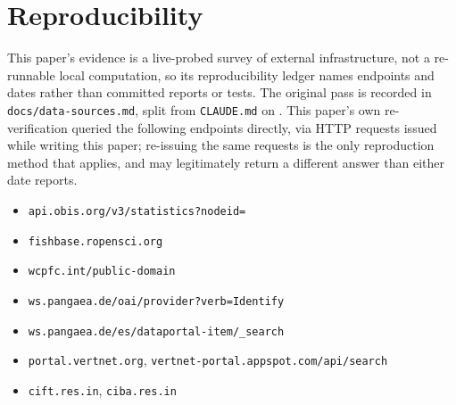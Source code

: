 \documentclass[runningheads]{llncs}
\begin{document}


\section*{Reproducibility}
This paper's evidence is a live-probed survey of external infrastructure,
not a re-runnable local computation, so its reproducibility ledger names
endpoints and dates rather than committed reports or tests. The original
\ProbeDate{} pass is recorded in \texttt{docs/data-sources.md}, split from
\texttt{CLAUDE.md} on \SplitDate{}. This paper's own \AsOf{} re-verification
queried the following endpoints directly, via HTTP requests issued while
writing this paper; re-issuing the same requests is the only reproduction
method that applies, and may legitimately return a different answer than
either date reports.
{\raggedright\sloppy
\begin{itemize}\itemsep1pt\parskip0pt
\item[] \texttt{api.obis.org/\allowbreak{}v3/\allowbreak{}statistics?nodeid=\allowbreak{}\IndObisNodeId{}}
\item[] \texttt{fishbase.ropensci.org}
\item[] \texttt{wcpfc.int/\allowbreak{}public-domain}
\item[] \texttt{ws.pangaea.de/\allowbreak{}oai/\allowbreak{}provider?verb=Identify}
\item[] \texttt{ws.pangaea.de/\allowbreak{}es/\allowbreak{}dataportal-item/\_search}
\item[] \texttt{portal.vertnet.org}, \texttt{vertnet-portal.appspot.com/\allowbreak{}api/\allowbreak{}search}
\item[] \texttt{cift.res.in}, \texttt{ciba.res.in}
\end{itemize}}



\end{document}
